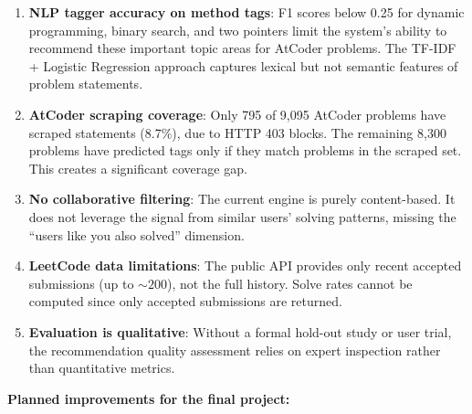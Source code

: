 \documentclass[12pt,a4paper]{article}
\begin{document}
\begin{enumerate}
    \item \textbf{NLP tagger accuracy on method tags}: F1 scores below 0.25 for dynamic programming, binary search, and two pointers limit the system's ability to recommend these important topic areas for AtCoder problems. The TF-IDF + Logistic Regression approach captures lexical but not semantic features of problem statements.

    \item \textbf{AtCoder scraping coverage}: Only 795 of 9,095 AtCoder problems have scraped statements (8.7\%), due to HTTP 403 blocks. The remaining 8,300 problems have predicted tags only if they match problems in the scraped set. This creates a significant coverage gap.

    \item \textbf{No collaborative filtering}: The current engine is purely content-based. It does not leverage the signal from similar users' solving patterns, missing the ``users like you also solved'' dimension.

    \item \textbf{LeetCode data limitations}: The public API provides only recent accepted submissions (up to ${\sim}200$), not the full history. Solve rates cannot be computed since only accepted submissions are returned.

    \item \textbf{Evaluation is qualitative}: Without a formal hold-out study or user trial, the recommendation quality assessment relies on expert inspection rather than quantitative metrics.
\end{enumerate}

\textbf{Planned improvements for the final project:}
\end{document}
